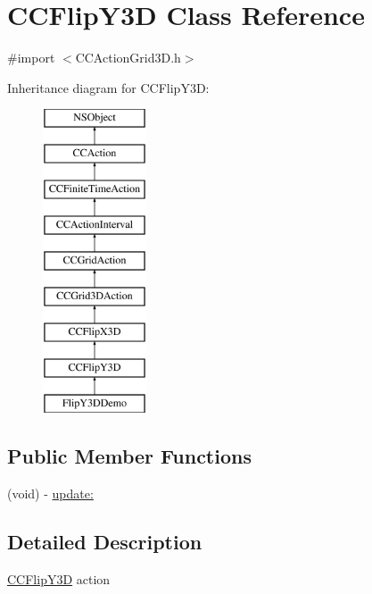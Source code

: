 \hypertarget{interface_c_c_flip_y3_d}{\section{C\-C\-Flip\-Y3\-D Class Reference}
\label{interface_c_c_flip_y3_d}
}


{\ttfamily \#import $<$C\-C\-Action\-Grid3\-D.\-h$>$}

Inheritance diagram for C\-C\-Flip\-Y3\-D\-:\begin{figure}[H]
\begin{center}
\leavevmode
\includegraphics[height=9.000000cm]{interface_c_c_flip_y3_d}
\end{center}
\end{figure}
\subsection*{Public Member Functions}
\begin{DoxyCompactItemize}
\item 
(void) -\/ \hyperlink{interface_c_c_flip_y3_d_a66602435f5d1a7372eab7ee69b9849cb}{update\-:}
\end{DoxyCompactItemize}


\subsection{Detailed Description}
\hyperlink{interface_c_c_flip_y3_d}{C\-C\-Flip\-Y3\-D} action 

